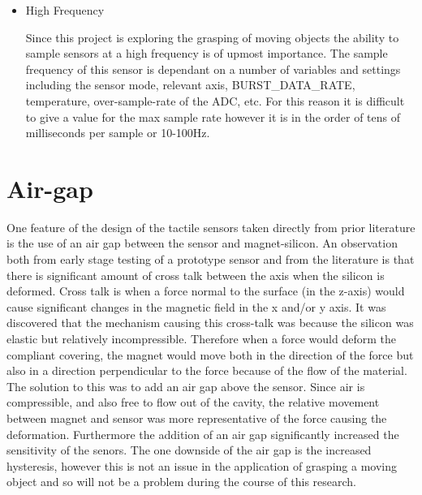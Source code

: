 \begin{itemize}
    \item High Frequency
    
    Since this project is exploring the grasping of moving objects the ability to sample sensors at a high frequency is of upmost importance. The sample frequency of this sensor is dependant on a number of variables and settings including the sensor mode, relevant axis, BURST\_DATA\_RATE, temperature, over-sample-rate of the ADC, etc. For this reason it is difficult to give a value for the max sample rate however it is in the order of tens of milliseconds per sample or 10-100Hz.
\end{itemize}

\section{Air-gap}
One feature of the design of the tactile sensors taken directly from prior literature is the use of an air gap between the sensor and magnet-silicon. An observation both from early stage testing of a prototype sensor and from the literature is that there is significant amount of cross talk between the axis when the silicon is deformed. Cross talk is when a force normal to the surface (in the z-axis) would cause significant changes in the magnetic field in the x and/or y axis. It was discovered that the mechanism causing this cross-talk was because the silicon was elastic but relatively incompressible. Therefore when a force would deform the compliant covering, the magnet would move both in the direction of the force but also in a direction perpendicular to the force because of the flow of the material. The solution to this was to add an air gap above the sensor. Since air is compressible, and also free to flow out of the cavity, the relative movement between magnet and sensor was more representative of the force causing the deformation. Furthermore the addition of an air gap significantly increased the sensitivity of the senors. The one downside of the air gap is the increased hysteresis, however this is not an issue in the application of grasping a moving object and so will not be a problem during the course of this research.

